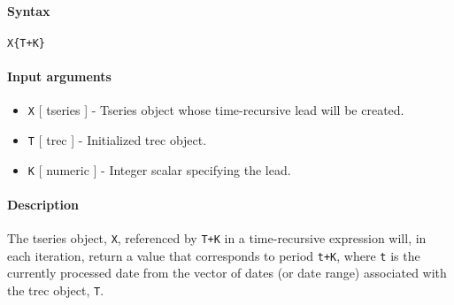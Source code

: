 


	\paragraph{Syntax}

\begin{verbatim}
X{T+K}
\end{verbatim}

\paragraph{Input arguments}

\begin{itemize}
\item
  \texttt{X} {[} tseries {]} - Tseries object whose time-recursive lead
  will be created.
\item
  \texttt{T} {[} trec {]} - Initialized trec object.
\item
  \texttt{K} {[} numeric {]} - Integer scalar specifying the lead.
\end{itemize}

\paragraph{Description}

The tseries object, \texttt{X}, referenced by \texttt{T+K} in a
time-recursive expression will, in each iteration, return a value that
corresponds to period \texttt{t+K}, where \texttt{t} is the currently
processed date from the vector of dates (or date range) associated with
the trec object, \texttt{T}.


